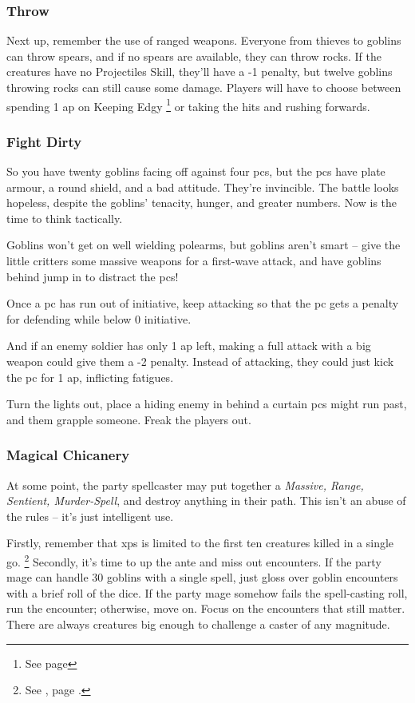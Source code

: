 \begin{multicols}{2}
\subsubsection{Throw}

Next up, remember the use of ranged weapons.
Everyone from thieves to goblins can throw spears, and if no spears are available, they can throw rocks.
If the creatures have no Projectiles Skill, they'll have a -1 penalty, but twelve goblins throwing rocks can still cause some damage.
Players will have to choose between spending 1 \gls{ap} on Keeping Edgy%
\footnote{See page \pageref{edgy}}
 or taking the hits and rushing forwards.

\subsubsection{Fight Dirty}

So you have twenty goblins facing off against four \glspl{pc}, but the \glspl{pc} have plate armour, a round shield, and a bad attitude.
They're invincible.
The battle looks hopeless, despite the goblins' tenacity, hunger, and greater numbers.
Now is the time to think tactically.

Goblins won't get on well wielding polearms, but goblins aren't smart -- give the little critters some massive weapons for a first-wave attack, and have goblins behind jump in to distract the \glspl{pc}!

Once a \gls{pc} has run out of initiative, keep attacking so that the \gls{pc} gets a penalty for defending while below 0 initiative.

And if an enemy soldier has only 1 \gls{ap} left, making a full attack with a big weapon could give them a -2 penalty.
Instead of attacking, they could just kick the \gls{pc} for 1 \gls{ap}, inflicting \glspl{fatigue}.

Turn the lights out, place a hiding enemy in behind a curtain \glspl{pc} might run past, and them grapple someone.
Freak the players out.

\subsubsection{Magical Chicanery}

At some point, the party spellcaster may put together a \textit{Massive, Range, Sentient, Murder-Spell}, and destroy anything in their path.
This isn't an abuse of the rules -- it's just intelligent use.

Firstly, remember that \glspl{xp} is limited to the first ten creatures killed in a single go.%
\footnote{See , page \pageref{xpCreatureMax}.}
Secondly, it's time to up the ante and miss out encounters.
If the party mage can handle 30 goblins with a single spell, just gloss over goblin encounters with a brief roll of the dice.
If the party mage somehow fails the spell-casting roll, run the encounter; otherwise, move on.
Focus on the encounters that still matter.
There are always creatures big enough to challenge a caster of any magnitude.


\end{multicols}
